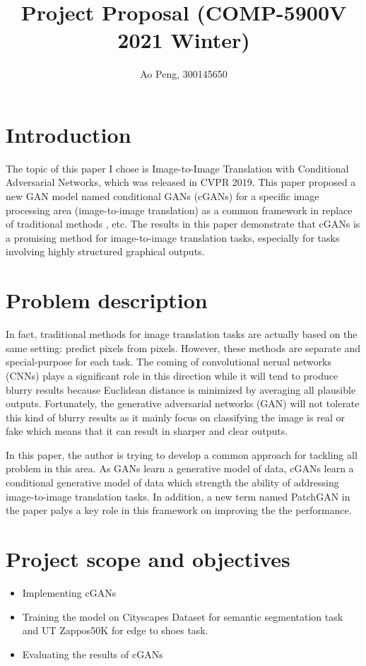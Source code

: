 \documentclass{article}
\begin{document}
\large

\title{ \textbf{Project Proposal (COMP-5900V 2021 Winter)}}
\author{Ao Peng, 300145650}
\date{}

\maketitle
\setlength{\baselineskip}{15pt}

\section{Introduction} 
The topic of this paper I chose is Image-to-Image Translation with Conditional Adversarial Networks\cite{isola2018imagetoimage}, which was released in CVPR 2019. This paper proposed a new GAN model named conditional GANs (cGANs) for a specific image processing area (image-to-image translation) as a common framework in replace of traditional methods \cite{efros2001image} \cite{fergus2006removing} \cite{eigen2015predicting}, etc. The results in this paper demonstrate that cGANs is a promising method for image-to-image translation tasks, especially for tasks involving highly structured graphical outputs.


\section{Problem description}
In fact, traditional methods for image translation tasks are actually based on the same setting: predict pixels from pixels. However, these methods are separate and special-purpose for each task. The coming of convolutional nerual networks (CNNs) plays a significant role in this direction while it will tend to produce blurry results because Euclidean distance is minimized by averaging all plausible outputs. Fortunately, the generative adversarial networks (GAN) \cite{goodfellow2014generative} will not tolerate this kind of blurry results as it mainly focus on classifying the image is real or fake which means that it can result in sharper and clear outputs.

\setlength{\parskip}{0.5em}
In this paper, the author is trying to develop a common approach for tackling all problem in this area. As GANs learn a generative model of data, cGANs learn a conditional generative model of data which strength the ability of addressing image-to-image translation tasks. In addition, a new term named PatchGAN in the paper palys a key role in this framework on improving the the performance.
\section{Project scope and objectives}
\begin{itemize}
    \item Implementing cGANs
    \item Training the model on Cityscapes Dataset \cite{Cordts2016Cityscapes} for semantic segmentation task and UT Zappos50K \cite{finegrained} \cite{semjitter} for edge to shoes task.
    \item Evaluating the results of cGANs
\end{itemize}







\end{document}
